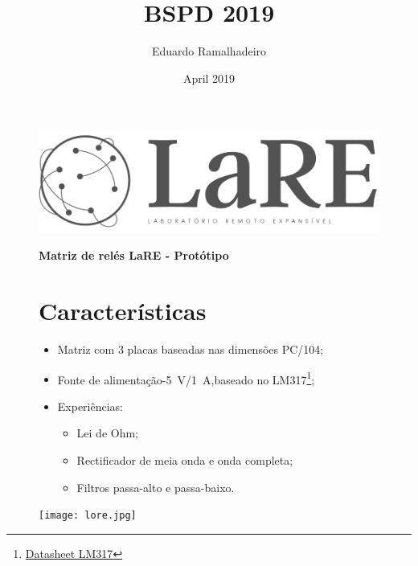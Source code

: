 \documentclass[a4paper,oneside,final,twocolumn]{article}
\title{BSPD 2019}
\author{Eduardo Ramalhadeiro}
\date{April 2019}
\begin{document}
\pagestyle{fancy}

\chead {\today}

\onecolumn

\begin{figure}
\begin{minipage}{0.47\textwidth}
\centering
\includegraphics[width=.7\textwidth,left,]{logo.jpg}

\end{minipage}
\hfill
\begin{minipage}{0.47\textwidth}
\raggedleft
\Huge \textbf{Matriz de relés LaRE - Protótipo}
\end{minipage}
\end{figure}


\begin{figure}
\begin{minipage}{0.47\textwidth}

\section{Características}
\begin{itemize}
    \item Matriz com 3 placas baseadas nas dimensões PC/104;
    \item Fonte de alimentação-\SI{5}{\volt}/\SI{1}{\ampere},\newline baseado no LM317\footnote{\href{https://www.ti.com/lit/ds/symlink/lm317.pdf}{Datasheet LM317}};
    \item Experiências:
    \begin{itemize}
        \item Lei de Ohm;
        \item Rectificador de meia onda e onda completa;
        \item Filtros passa-alto e passa-baixo.
    \end{itemize}
\end{itemize}


\end{minipage}
\hfill
\begin{minipage}{0.47\textwidth}
\centering
\texttt{[image: lore.jpg]}

\end{minipage}
\end{figure}
\end{document}
